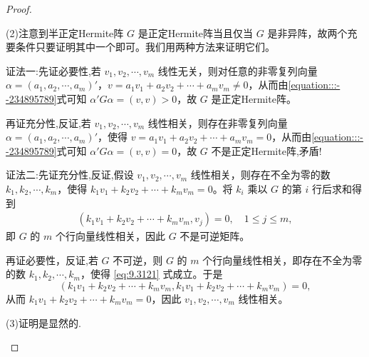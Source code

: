 \documentclass[../../main.tex]{subfiles}
\begin{document}
\begin{proof}
\begin{enumerate}
(2)注意到半正定Hermite阵 $G$ 是正定Hermite阵当且仅当 $G$ 是非异阵，故两个充要条件只要证明其中一个即可。我们用两种方法来证明它们。

{\color{blue}证法一:}先证必要性,若 $v_1,v_2,\cdots,v_m$ 线性无关，则对任意的非零复列向量 $\alpha=(a_1,a_2,\cdots,a_m)'$，$v = a_1v_1 + a_2v_2 + \cdots + a_mv_m\neq0$，从而由\eqref{equation:::--234895789}式可知 $\alpha'G\alpha=(v,v)>0$，故 $G$ 是正定Hermite阵。

再证充分性,反证,若 $v_1,v_2,\cdots,v_m$ 线性相关，则存在非零复列向量 $\alpha=(a_1,a_2,\cdots,a_m)'$，使得 $v = a_1v_1 + a_2v_2 + \cdots + a_mv_m = 0$，从而由\eqref{equation:::--234895789}式可知 $\alpha'G\alpha=(v,v)=0$，故 $G$ 不是正定Hermite阵,矛盾!

{\color{blue}证法二:}先证充分性,反证,假设 $v_1,v_2,\cdots,v_m$ 线性相关，则存在不全为零的数 $k_1,k_2,\cdots,k_m$，使得 $k_1v_1 + k_2v_2 + \cdots + k_mv_m = 0$。将 $k_i$ 乘以 $G$ 的第 $i$ 行后求和得到
\begin{align}
(k_1v_1 + k_2v_2 + \cdots + k_mv_m,v_j)=0,\quad 1\leq j\leq m,\label{eq:9.3121}
\end{align}
即 $G$ 的 $m$ 个行向量线性相关，因此 $G$ 不是可逆矩阵。

再证必要性，反证,若 $G$ 不可逆，则 $G$ 的 $m$ 个行向量线性相关，即存在不全为零的数 $k_1,k_2,\cdots,k_m$，使得 \eqref{eq:9.3121} 式成立。于是
\[
(k_1v_1 + k_2v_2 + \cdots + k_mv_m,k_1v_1 + k_2v_2 + \cdots + k_mv_m)=0,
\]
从而 $k_1v_1 + k_2v_2 + \cdots + k_mv_m = 0$，因此 $v_1,v_2,\cdots,v_m$ 线性相关。

(3)证明是显然的.
\end{enumerate}
\end{proof}
\end{document}
